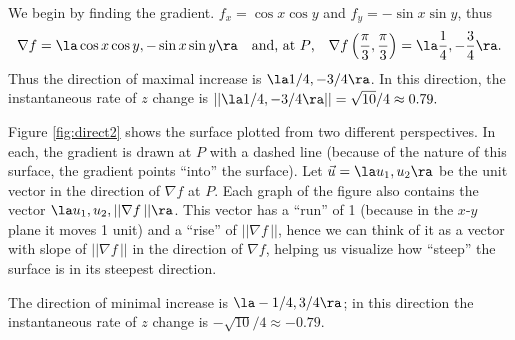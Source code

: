 {We begin by finding the gradient. $f_x = \cos x\cos y$ and $f_y = -\sin x\sin y$, thus 
$$\nabla f = \la \cos x\cos y,-\sin x\sin y\ra \quad \text{and, at $P$,} \quad \nabla f\left(\frac{\pi}3,\frac{\pi}3\right) = \la\frac14,-\frac34\ra.$$
Thus the direction of maximal increase is $\la 1/4, -3/4\ra$. In this direction, the instantaneous rate of $z$ change is $||\la 1/4,-3/4\ra|| = \sqrt{10}/4 \approx 0.79.$ 

Figure \ref{fig:direct2} shows the surface plotted from two different perspectives. In each, the gradient is drawn at $P$ with a dashed line (because of the nature of this surface, the gradient points ``into'' the surface). Let $\vec u = \la u_1, u_2\ra $ be the unit vector in the direction of $\nabla f$ at $P$. Each graph of the figure also contains the vector $\la u_1, u_2, ||\nabla f\,||\ra$. This vector has a ``run'' of 1 (because in the $x$-$y$ plane it moves 1 unit) and a ``rise'' of $||\nabla f\,||$, hence we can think of it as a vector with slope of $||\nabla f\,||$ in the direction of $\nabla f$, helping us visualize how ``steep'' the surface is in its steepest direction. 


The direction of minimal increase is $\la -1/4,3/4\ra$; in this direction the instantaneous rate of $z$ change is $-\sqrt{10}/4 \approx -0.79$.

}
